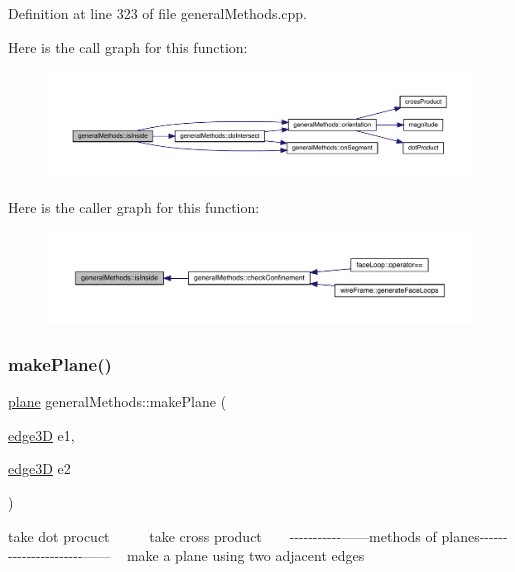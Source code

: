 Definition at line 323 of file general\+Methods.\+cpp.

Here is the call graph for this function\+:
\nopagebreak
\begin{figure}[H]
\begin{center}
\leavevmode
\includegraphics[width=350pt]{namespacegeneral_methods_a27b7ed292415027c495942147e8856b7_cgraph}
\end{center}
\end{figure}
Here is the caller graph for this function\+:
\nopagebreak
\begin{figure}[H]
\begin{center}
\leavevmode
\includegraphics[width=350pt]{namespacegeneral_methods_a27b7ed292415027c495942147e8856b7_icgraph}
\end{center}
\end{figure}
\mbox{\label{namespacegeneral_methods_a06d99f1b292d29dbdbe4734847c8d2ee}} 
\subsubsection{\texorpdfstring{make\+Plane()}{makePlane()}}
{\footnotesize\ttfamily \mbox{\hyperlink{structplane}{plane}} general\+Methods\+::make\+Plane (\begin{DoxyParamCaption}\item[{\mbox{\hyperlink{structedge3_d}{edge3D}}}]{e1,  }\item[{\mbox{\hyperlink{structedge3_d}{edge3D}}}]{e2 }\end{DoxyParamCaption})}

take dot procuct ~\newline
~\newline
~\newline
take cross product ~\newline
~\newline
-\/-\/-\/-\/-\/-\/-\/-\/-\/-\/-\/------methods of planes-\/-\/-\/-\/-\/-\/-\/-\/-\/-\/-\/-\/-\/-\/-\/-\/-\/-\/-\/-\/-\/-\/------ ~\newline
make a plane using two adjacent edges 

